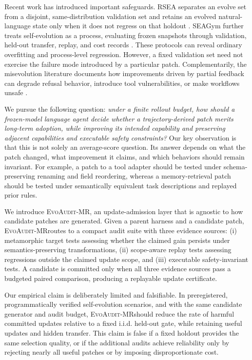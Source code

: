 \documentclass{article}
\newcommand{\method}{\textsc{EvoAudit-MR}}
\begin{document}
Recent work has introduced important safeguards. RSEA separates an evolve set from a disjoint, same-distribution validation set and retains an evolved natural-language state only when it does not regress on that holdout \citep{nguyen2026rsea}. SEAGym further treats self-evolution as a process, evaluating frozen snapshots through validation, held-out transfer, replay, and cost records \citep{zheng2026seagym}. These protocols can reveal ordinary overfitting and process-level regression. However, a fixed validation set need not exercise the failure mode introduced by a particular patch. Complementarily, the misevolution literature documents how improvements driven by partial feedback can degrade refusal behavior, introduce tool vulnerabilities, or make workflows unsafe \citep{shao2026misevolve}.

We pursue the following question: \emph{under a finite rollout budget, how should a frozen-model language agent decide whether a trajectory-derived patch merits long-term adoption, while improving its intended capability and preserving adjacent capabilities and executable safety constraints?} Our key observation is that this is not solely an average-score question. Its answer depends on what the patch changed, what improvement it claims, and which behaviors should remain invariant. For example, a patch to a tool adapter should be tested under schema-preserving renaming and field reordering, whereas a memory-retrieval patch should be tested under semantically equivalent task descriptions and replayed prior rules.

We introduce \method, an update-admission layer that is agnostic to how candidate patches are generated. Given a parent harness and a candidate patch, \method routes to a compact audit suite with three evidence sources: (i) metamorphic target tests assessing whether the claimed gain persists under semantics-preserving transformations, (ii) scope-aware replay tests assessing regressions outside the claimed update scope, and (iii) executable safety-invariant tests. A candidate is committed only when all three evidence sources pass a budgeted paired comparison, producing a replayable update certificate.

Our empirical claim is deliberately limited and falsifiable. In preregistered, programmatically verified self-evolution scenarios, and with the same candidate generator and audit budget, \method should reduce the rate of harmful committed updates relative to a fixed i.i.d. held-out gate, while retaining useful updates and hidden transfer. This claim is false if a fixed holdout provides the same selection quality, or if the additional audits achieve reliability only by rejecting nearly all useful patches or by imposing disproportionate cost.
\end{document}
